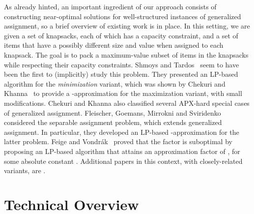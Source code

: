 \documentclass[11pt]{article}
\theoremstyle{plain}
\theoremstyle{definition}
\begin{document}
As already hinted, an important ingredient of our approach consists of constructing near-optimal solutions for well-structured instances of generalized assignment, so a brief overview of existing work is in place. In this setting, we are given a set of knapsacks, each of which has a capacity constraint, and a set of items that have a possibly different size and value when assigned to each knapsack. The goal is to pack a maximum-value subset of items in the knapsacks while respecting their capacity constraints. Shmoys and Tardos~\cite{ShmoysT93} seem to have been the first to (implicitly) study this problem. They presented an LP-based algorithm for the \textit{minimization} variant, which was shown by Chekuri and Khanna~\cite{ChekuriK05} to provide a -approximation for the maximization variant, with small modifications. Chekuri and Khanna also classified several APX-hard special cases of generalized assignment. Fleischer, Goemans, Mirrokni and Sviridenko~\cite{FleischerGMS11} considered the separable assignment problem, which extends generalized assignment. In particular, they developed an LP-based -approximation for the latter problem. Feige and Vondr{\'a}k~\cite{FeigeV06} proved that the  factor is suboptimal by proposing an LP-based algorithm that attains an approximation factor of , for some absolute constant . Additional papers in this context, with closely-related variants, are \cite{CohenKR06,NutovBY06}.



\section{Technical Overview} \label{sec:techniques}
\end{document}
